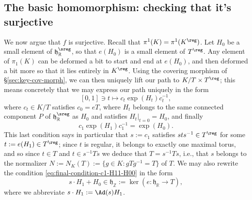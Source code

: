 \documentclass[reqno]{amsart} 
\begin{document}
\subsection{The basic homomorphism: checking that it's surjective}
\label{sec:orgea26b3f}
We now argue that $f$ is surjective.  Recall that $\pi^1(K) = \pi^1(K^{\reg})$.  Let $H_0$ be a small element of $\mathfrak{h}_{\mathbb{R}}^{\sreg}$, so that $e(H_0)$ is a small element of $T^{\reg}$.  Any element of $\pi_1(K)$ can be deformed a bit to start and end at $e(H_0)$, and then deformed a bit more so that it lies entirely in $K^{\reg}$.  Using the covering morphism of \S\ref{sec:key-cov-morph}, we can then uniquely lift our path to $K/T \times T^{\reg}$; this means concretely that we may express our path uniquely in the form
\begin{equation*}
  {} [0,1]
  \ni t \mapsto c_t \exp(H_t) c_t^{-1},
\end{equation*}
where $c_t \in K/T$ satisfies $c_0 = e T$, where $H_t$ belongs to the same connected component $P$ of $\mathfrak{h}_{\mathbb{R}}^{\sreg}$ as $H_0$ and satisfies $H_t|_{t=0} = H_0$, and finally
\begin{equation}\label{eq:final-condition-c1-H11-H00}
  c_1 \exp(H_1) c_1^{-1} = \exp(H_0).
\end{equation}
This last condition says in particular that $s := c_1$ satisfies $s t s^{-1} \in T^{\reg}$ for some $t := e(H_1) \in T^{\reg}$; since $t$ is regular, it belongs to exactly one maximal torus, and so since $t \in T$ and $t \in s^{-1} T s$ we deduce that $T = s^{-1} T s$, i.e., that $s$ belongs to the normalizer $N := N_K(T) := \{g \in K : g T g^{-1} = T\}$ of $T$.  We may also rewrite the condition \eqref{eq:final-condition-c1-H11-H00} in the form
\begin{equation}\label{eq:integrality-condition-on-s-H11-H00}
  s \cdot H_1 + H_0 \in \mathfrak{h}_\mathbb{Z} := \ker(e : \mathfrak{h}_\mathbb{R} \rightarrow T),
\end{equation}
where we abbreviate $s \cdot H_1 := \Ad(s) H_1$.
\end{document}
